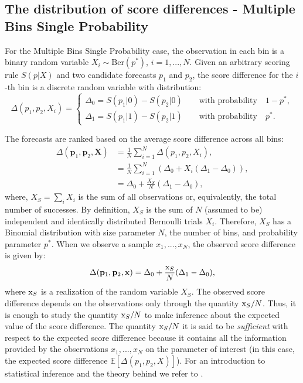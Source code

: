 \documentclass[referee,sn-basic]{sn-jnl}
\theoremstyle{thmstyleone}%
\theoremstyle{thmstyletwo}%
\theoremstyle{thmstylethree}%
\begin{document}
\subsection{ The distribution of score differences - Multiple Bins Single Probability }

For the Multiple Bins Single Probability case, the observation in each bin is a binary random variable $X_i \sim \text{Ber}(p^*)$, $i = 1,...,N$. Given an arbitrary scoring rule $S(p\vert X)$ and two candidate forecasts $p_1$ and $p_2$, the score difference for the $i$-th bin is a discrete random variable with distribution:
$$
\Delta(p_1, p_2, X_i) = 
\begin{cases}
\Delta_0 = S(p_1\vert 0) - S(p_2\vert 0) \quad\quad \text{with probability} \quad 1-p^* , \\
\Delta_1 = S(p_1\vert 1) - S(p_2\vert 1) \quad\quad \text{with probability} \quad p^*.
\end{cases}
$$

The forecasts are ranked based on the average score difference across all bins:
$$
\begin{aligned}
\Delta(\mathbf p_1, \mathbf p_2 , \mathbf X) &= \frac{1}{N}\sum_{i = 1}^N \Delta(p_1, p_2, X_i), \\
& = \frac{1}{N} \sum_{i = 1}^N\left( \Delta_0 + X_i(\Delta_1 - \Delta_0)\right),\\
& = \Delta_0 + \frac{X_S}{N}(\Delta_1 - \Delta_0),  
\end{aligned}
$$
where, $X_S = \sum_i X_i$ is the sum of all observations or, equivalently, the total number of successes. By definition, $X_S$ is the sum of $N$ (assumed to be) independent and identically distributed Bernoulli trials $X_i$. Therefore, $X_S$ has a Binomial distribution with size parameter $N$, the number of bins, and probability parameter $p^*$. When we observe a sample $x_1,...,x_N$, the observed score difference is given by:
$$
\Delta(\mathbf p_1, \mathbf p_2, \mathbf x) = \Delta_0 + \frac{\text x_S}{N}(\Delta_1 - \Delta_0),
$$
where $\text x_S$ is a realization of the random variable $X_S$. The observed score difference depends on the observations only through the quantity $\text x_S/N$. Thus, it is enough to study the quantity $\text x_S/N$ to make inference about the expected value of the score difference. The quantity $\text x_S/N$ it is said to be \emph{sufficient} \citep{fisher1922} with respect to the expected score difference because it contains all the information provided by the observations $x_1,...,x_N$ on the parameter of interest (in this case, the expected score difference $\mathbb E[\Delta(p_1, p_2, X)]$). For an introduction to statistical inference and the theory behind we refer to \citep{schervish2012,hastie2009elements}. 
\end{document}
